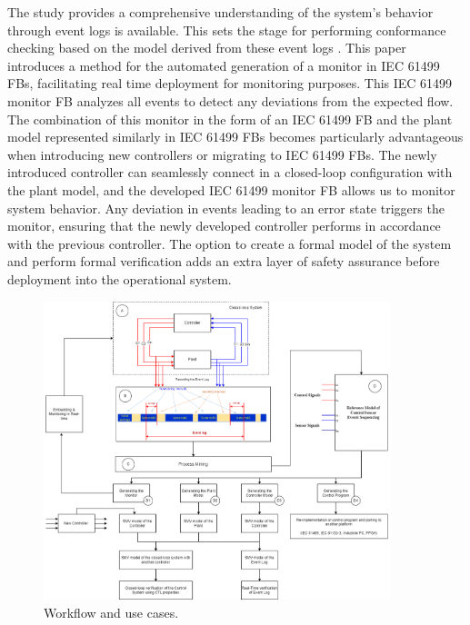 \begin{bibunit}
The study provides a comprehensive understanding of the system's behavior through event logs is available. This sets the stage for performing conformance checking  based on the model derived from these event logs \cite{van2012replaying, munoz2016conformance}.  This paper introduces a method for the automated generation of a monitor in IEC 61499 FBs, facilitating real time deployment for monitoring purposes. This IEC 61499 monitor FB analyzes all events to detect any deviations from the expected flow.  The combination of this monitor in the form of an IEC 61499 FB and the plant model represented similarly in IEC 61499 FBs becomes particularly advantageous when introducing new controllers or migrating to IEC 61499 FBs. The newly introduced controller can seamlessly connect in a closed-loop configuration with the plant model, and the developed IEC 61499 monitor FB allows us to monitor system behavior. Any deviation in events leading to an error state triggers the monitor, ensuring that the newly developed controller performs in accordance with the previous controller. The option to create a formal model of the system and perform formal verification adds an extra layer of safety assurance before deployment into the operational system.




\begin{figure}[!t]
	\centering
	\includegraphics[width=0.9\textwidth]{MX_Papers/Paper7/images/workflow1.png}
	\caption{Workflow and use cases.}
	\label{workflowUsecase}
\end{figure}


\end{bibunit}
